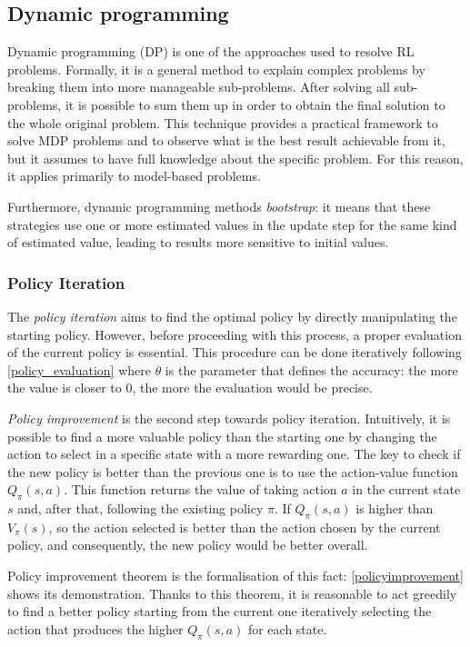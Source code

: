 \subsection{Dynamic programming} \label{dp}

Dynamic programming (DP) is one of the approaches used to resolve RL problems. Formally, it is a general method to explain complex problems by breaking them into more manageable sub-problems. After solving all sub-problems, it is possible to sum them up in order to obtain the final solution to the whole original problem.
This technique provides a practical framework to solve MDP problems and to observe what is the best result achievable from it, but it assumes to have full knowledge about the specific problem. For this reason, it applies primarily to model-based problems.

Furthermore, dynamic programming methods \textit{bootstrap}: it means that these strategies use one or more estimated values in the update step for the same kind of estimated value, leading to results more sensitive to initial values.

\subsubsection{Policy Iteration}

The \textit{policy iteration} aims to find the optimal policy by directly manipulating the starting policy. However, before proceeding with this process, a proper evaluation of the current policy is essential. This procedure can be done iteratively following \vref{policy_evaluation} where $\theta$ is the parameter that defines the accuracy: the more the value is closer to $0$, the more the evaluation would be precise.

\textit{Policy improvement} is the second step towards policy iteration. Intuitively, it is possible to find a more valuable policy than the starting one by changing the action to select in a specific state with a more rewarding one.  The key to check if the new policy is better than the previous one is to use the action-value function $Q_\pi(s,a)$. This function returns the value of taking action $a$ in the current state $s$ and, after that, following the existing policy $\pi$. If $Q_\pi(s,a)$ is higher than $V_\pi(s)$, so the action selected is better than the action chosen by the current policy, and consequently, the new policy would be better overall.

Policy improvement theorem is the formalisation of this fact: \vref{policyimprovement} shows its demonstration. Thanks to this theorem, it is reasonable to act greedily to find a better policy starting from the current one iteratively selecting the action that produces the higher  $Q_\pi(s, a)$ for each state.

